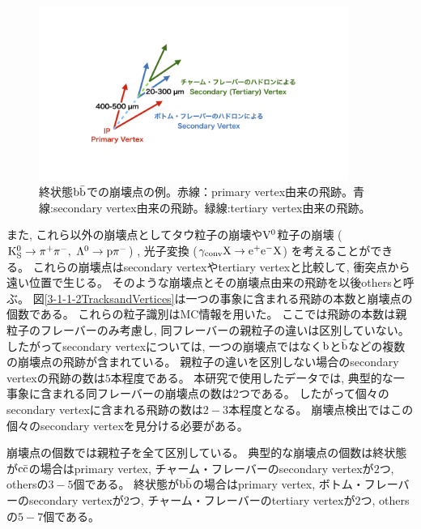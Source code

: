 \begin{figure}[htbp]
 \centering
 \includegraphics[trim = 200 200 200 200, width=0.9\textwidth, clip]{Figure/3Networks/3-1-1-1FinalStateBB.png}
 \caption[終状態$\rm b\bar{b}$での崩壊点の例]{終状態$\rm b\bar{b}$での崩壊点の例。赤線：primary vertex由来の飛跡。青線:secondary vertex由来の飛跡。緑線:tertiary vertex由来の飛跡。}
 \label{3-1-1-1FinalStateBB}
\end{figure}

また, これら以外の崩壊点としてタウ粒子の崩壊や$\rm V^0$粒子の崩壊 ($\rm K^0_S \to \pi^+\pi^-,\ \Lambda^0 \to p \pi^-$) , 光子変換 ($\rm \gamma_{conv} X \to e^+e^-X$) を考えることができる。
これらの崩壊点はsecondary vertexやtertiary vertexと比較して, 衝突点から遠い位置で生じる。
そのような崩壊点とその崩壊点由来の飛跡を以後othersと呼ぶ。
図\ref{3-1-1-2TracksandVertices}は一つの事象に含まれる飛跡の本数と崩壊点の個数である。
これらの粒子識別はMC情報を用いた。
ここでは飛跡の本数は親粒子のフレーバーのみ考慮し, 同フレーバーの親粒子の違いは区別していない。
したがってsecondary vertexについては, 一つの崩壊点ではなく$\rm b$と$\rm \bar{b}$などの複数の崩壊点の飛跡が含まれている。
親粒子の違いを区別しない場合のsecondary vertexの飛跡の数は$5$本程度である。
本研究で使用したデータでは, 典型的な一事象に含まれる同フレーバーの崩壊点の数は$2$つである。
したがって個々のsecondary vertexに含まれる飛跡の数は$2-3$本程度となる。
崩壊点検出ではこの個々のsecondary vertexを見分ける必要がある。

崩壊点の個数では親粒子を全て区別している。
典型的な崩壊点の個数は終状態が$\rm c\bar{c}$の場合はprimary vertex, チャーム・フレーバーのsecondary vertexが$2$つ, othersの$3-5$個である。
終状態が$\rm b\bar{b}$の場合はprimary vertex, ボトム・フレーバーのsecondary vertexが$2$つ, チャーム・フレーバーのtertiary vertexが$2$つ, othersの$5-7$個である。

